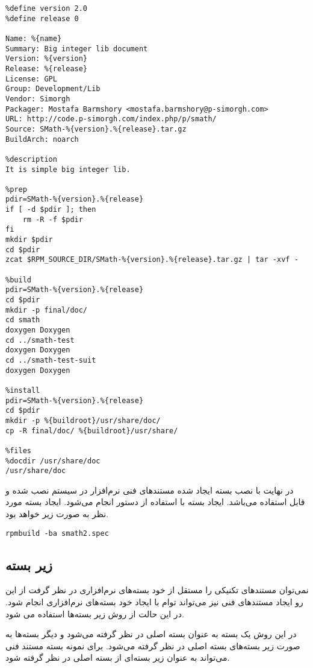 \begin{latin}
\lstset{language=TeX}  
\begin{lstlisting}[frame=single] 
%define name smath-doc
%define version 2.0
%define release 0

Name: %{name}
Summary: Big integer lib document
Version: %{version}
Release: %{release}
License: GPL
Group: Development/Lib
Vendor: Simorgh 
Packager: Mostafa Barmshory <mostafa.barmshory@p-simorgh.com>
URL: http://code.p-simorgh.com/index.php/p/smath/
Source: SMath-%{version}.%{release}.tar.gz
BuildArch: noarch

%description
It is simple big integer lib. 

%prep
pdir=SMath-%{version}.%{release}
if [ -d $pdir ]; then
	rm -R -f $pdir
fi
mkdir $pdir
cd $pdir
zcat $RPM_SOURCE_DIR/SMath-%{version}.%{release}.tar.gz | tar -xvf -

%build
pdir=SMath-%{version}.%{release}
cd $pdir
mkdir -p final/doc/
cd smath
doxygen Doxygen
cd ../smath-test
doxygen Doxygen
cd ../smath-test-suit
doxygen Doxygen

%install
pdir=SMath-%{version}.%{release}
cd $pdir
mkdir -p %{buildroot}/usr/share/doc/
cp -R final/doc/ %{buildroot}/usr/share/

%files
%docdir /usr/share/doc
/usr/share/doc
\end{lstlisting}
\end{latin}

در نهایت با نصب بسته ایجاد شده مستندهای فنی نرم‌افزار در سیستم نصب شده و قابل
استفاده می‌باشد. ایجاد بسته با استفاده از دستور  انجام می‌شود.
ایجاد بسته مورد نظر به صورت زیر خواهد بود.

\begin{latin}
\lstset{language=TeX}  
\begin{lstlisting}[frame=single] 
rpmbuild -ba smath2.spec
\end{lstlisting}
\end{latin}

\subsection{زیر بسته}

نمی‌توان مستندهای تکنیکی را مستقل از خود بسته‌های نرم‌افزاری در نظر گرفت از این
رو ایجاد مستندهای فنی نیز می‌تواند توام با ایجاد خود بسته‌های نرم‌افزاری انجام
شود. در این حالت از روش زیر بسته‌ها استفاده می شود.

در این روش یک بسته به عنوان بسته اصلی در نظر گرفته می‌شود و دیگر بسته‌ها به صورت
زیر بسته‌های بسته اصلی در نظر گرفته می‌شود. برای نمونه بسته مستند فنی می‌تواند
به عنوان زیر بسته‌ای از بسته اصلی  در نظر گرفته شود.

